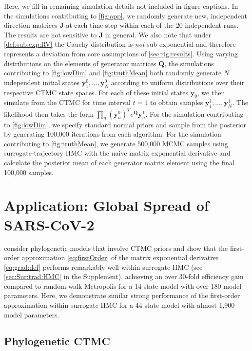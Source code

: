\documentclass[9pt,twocolumn,twoside]{pnas-new}
\newcommand{\?}{\textbf{?}}
\newcommand{\y}{\mathbf{y}}
\newcommand{\QQ}{\mathbf{Q}}
\newcommand{\JJ}{\mathbf{J}}
\begin{document}
Here, we fill in remaining simulation details not included in figure captions. In the simulations contributing to \cref{fig:app}, we randomly generate new, independent direction matrices $\JJ$ at each time step within each of the 20 independent runs. The results are not sensitive to $\JJ$ in general.  We also note that under \cref{def:sub:exp:RV} the Cauchy distribution is \emph{not} sub-exponential and therefore represents a deviation from core assumptions of \cref{sec:rig:results}.  Using varying distributions on the elements of generator matrices $\QQ$, the simulations contributing to \cref{fig:lowDim} and \cref{fig:truthMean} both randomly generate $N$ independent initial states $\y^0_1,\dots,\y^0_N$ according to uniform distributions over their respective CTMC state spaces. For each of these initial states $\y_0$, we then simulate from the CTMC for time interval $t=1$ to obtain samples $\y^1_1,\dots,\y^1_N$.  The likelihood then takes the form $\prod_n (\y^{0}_n)^T e^{\QQ} \y^{1}_n$.  For the simulation contributing to \cref{fig:lowDim}, we specify standard normal priors and sample from the posterior by generating 100,000 iterations from each algorithm.  For the simulation contributing to \cref{fig:truthMean}, we generate 500,000 MCMC samples using surrogate-trajectory HMC with the naive matrix exponential derivative and calculate the posterior mean of each generator matrix element using the final 100,000 samples.  




\section{Application: Global Spread of SARS-CoV-2}
\label{sec:sars:cov:app}



\cite{magee2023random} consider phylogenetic models that involve CTMC
priors and show that the first-order approximation
\eqref{eq:firstOrder} of the matrix exponential derivative
\eqref{eq:grad:def} performs remarkably well within surrogate HMC (see
\cref{sec:Sur:trad:HMC} in the Supplement), achieving an over 30-fold
efficiency gain compared to random-walk Metropolis for a 14-state
model with over 180 model parameters.  Here, we demonstrate similar
strong performance of the first-order approximation within surrogate
HMC for a 44-state model with almost 1,900 model parameters.



\subsection*{Phylogenetic CTMC}
\end{document}
